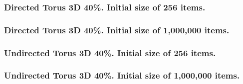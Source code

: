\clearpage{}

\subsubsection{Directed Torus 3D 40\%. Initial size of 256 items.}



\clearpage
\subsubsection{Directed Torus 3D 40\%. Initial size of  1,000,000 items.}



\clearpage
\subsubsection{Undirected Torus 3D 40\%. Initial size of 256 items.}



\clearpage
\subsubsection{Undirected Torus 3D 40\%. Initial size of  1,000,000 items.}




